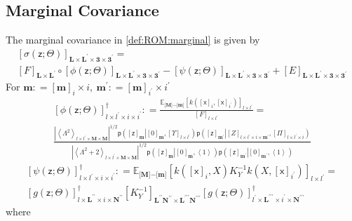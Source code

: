 \documentclass[preprint,12pt]{elsarticle}
\newcommand*{\M}[1]{\ensuremath{#1}\xspace}
\newcommand*{\x}{\times}
\newcommand*{\mi}[1]{\mathbf{#1}}
\newcommand*{\rv}[1]{\mathsf{#1}}
\newcommand*{\te}[2][]{\left\lbrack{#2}\right\rbrack_{#1}}
\newcommand*{\tse}[2][]{\mi{\lbrack#2\rbrack}_{#1}}
\newcommand*{\diag}[2][]{\left\langle{#2}\right\rangle_{#1}}
\newcommand*{\prob}[3]{\M{\mathsf{p}\!\left(\left.{#1}\right\vert{#2,#3}\right)}}
\newcommand*{\deq}{\M{\mathrel{\mathop:}=}}
\newcommand*{\evt}[3][]{\mathbb{E}_{#3}^{#1}\!#2}
\newcommand*{\modulus}[1]{\M{\left\lvert{#1}\right\rvert}}
\begin{document}
    \subsection{Marginal Covariance} \label{sub:ROM:Covariance}
        The marginal covariance in \cref{def:ROM:marginal} is given by
        \begin{multline*}
            \te[\mi{L\x L^{\prime}\x 3\x 3^{\prime}}]{\sigma(\rv{z}; \Theta)} = \\
            \te[\mi{L\x L^{\prime}}]{F} \circ \te[\mi{L\x L^{\prime}\x 3\x 3^{\prime}}]{\phi(\rv{z}; \Theta)} - 
            \te[\mi{L\x L^{\prime}\x 3\x 3^{\prime}}]{\psi(\rv{z}; \Theta)}                
            + \te[\mi{L\x L^{\prime}\x 3\x 3^{\prime}}]{E}                        
        \end{multline*}
        For $\mi{m} \deq \te[i]{\mi{m}}\x i, \   \mi{m^{\prime}}\deq\te[i^{\prime}]{\mi{m}}\x i^{\prime}$
        \begin{multline*}
            \te[l\x l^{\prime}\x i\x i^{\prime}]{\phi(\rv{z}; \Theta)}^{\dagger}
            \deq \frac{\evt{\te[l\x l^{\prime}]{k(\te[i]{\rv{x}},\te[i^{\prime}]{\rv{x}})}}{\tse{M}\mi{-}\tse{m}}}{\te[l\x l^{\prime}]{F}} = \\
            \frac
            {\modulus{\diag[l\x l^{\prime}\x\mi{M}\x\mi{M}]{\Lambda^{2}}}^{1/2} \prob{\te[\mi{m}]{\rv{z}}}{\te[\mi{m}]{0}}{\te[l\x l^{\prime}]{\Upsilon}}\prob{\te[\mi{m^{\prime}}]{\rv{z}}}{\te[l\x l^{\prime}\x i\x\mi{m^{\prime}}]{Z}}{\te[l\x l^{\prime}\x i]{\Pi}}}
            {\modulus{\diag[l\x l^{\prime}\x\mi{M}\x\mi{M}]{\Lambda^{2}+2}}^{1/2}
            \prob{\te[\mi{m}]{\rv{z}}}{\te[\mi{m}]{0}}{\diag{1}}\prob{\te[\mi{m^{\prime}}]{\rv{z}}}{\te[\mi{m^{\prime}}]{0}}{\diag{1}}}
        \end{multline*}
        \begin{multline*}
            \te[l\x l^{\prime}\x i\x i^{\prime}]{\psi(\rv{z}; \Theta)}^{\dagger}
            \deq \evt{\te[l\x l^{\prime}]{k(\te[i]{\rv{x}},X) K_{Y}^{-1} k(X,\te[i^{\prime}]{\rv{x}})}}{\tse{M}\mi{-}\tse{m}} = \\
            \te[l\x\mi{L^{\prime\prime}}\x i \x\mi{N^{\prime\prime}}]{g({\rv{z}}; \Theta)}^{\dagger}
            \te[\mi{L^{\prime\prime}N^{\prime\prime}}\x\mi{L^{\prime\prime\prime}N^{\prime\prime\prime}}]{K_{Y}^{-1}} 
            \te[l^{\prime}\x\mi{L^{\prime\prime\prime}}\x i^{\prime} \x\mi{N^{\prime\prime\prime}}]{g({\rv{z}}; \Theta)}^{\dagger}
        \end{multline*}
        where
\end{document}
